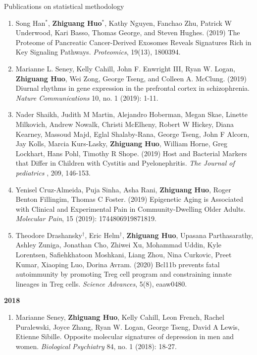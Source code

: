 \documentclass{resume} %
\begin{document}
\begin{rSection}{Publications on statistical methodology}
\begin{enumerate}[noitemsep,topsep=0pt,resume]
\item Song Han$^*$, {\bf Zhiguang Huo}$^*$,  Kathy Nguyen,  Fanchao Zhu, Patrick W Underwood, Kari Basso, Thomas George, and Steven Hughes. (2019)
The Proteome of Pancreatic Cancer-Derived Exosomes Reveals Signatures Rich in Key Signaling Pathways. \emph{Proteomics}, 19(13), 1800394.
    \label{bioinfo_10}

\item Marianne L. Seney, Kelly Cahill, John F. Enwright III, Ryan W. Logan, {\bf  Zhiguang Huo}, Wei Zong, George Tseng, and Colleen A. McClung. (2019) Diurnal rhythms in gene expression in the prefrontal cortex in schizophrenia. \emph{Nature Communications} 10, no. 1 (2019): 1-11.
    \label{bioinfo_9} 


\item  
Nader Shaikh, Judith M Martin, Alejandro Hoberman, Megan Skae, Linette Milkovich, Andrew Nowalk, Christi McElheny, Robert W Hickey, Diana Kearney, Massoud Majd, Eglal Shalaby-Rana, George Tseng, John F Alcorn, Jay Kolls, Marcia Kurs-Lasky, {\bf Zhiguang Huo}, William Horne, Greg Lockhart, Hans Pohl, Timothy R Shope. 
(2019)
Host and Bacterial Markers that Differ in Children with Cystitis and Pyelonephritis. \emph{The Journal of pediatrics} , 209, 146-153.
    \label{bioinfo_8} \label{mlapp_2} 


\item Yenisel Cruz-Almeida, Puja Sinha, Asha Rani, {\bf Zhiguang Huo}, Roger Benton Fillingim, Thomas C Foster. (2019)
Epigenetic Aging is Associated with Clinical and Experimental Pain in Community-Dwelling Older Adults.
\emph{Molecular Pain}, 15 (2019): 1744806919871819.
    \label{bioinfo_7}


\item 
Theodore Drashansky$^\dagger$, Eric  Helm$^\dagger$, {\bf Zhiguang Huo}, Upasana Parthasarathy,  Ashley Zuniga, Jonathan Cho, Zhiwei Xu,  Mohammad Uddin,  Kyle Lorentsen, Safiehkhatoon Moshkani, Liang Zhou, Nina Curkovic, Preet Kumar,  Xiaoping Luo, Dorina Avram. (2020)
Bcl11b prevents fatal autoimmunity by promoting Treg cell program and constraining innate lineages in Treg cells. 
\emph{Science Advances}, 5(8), eaaw0480.
    \label{bioinfo_6}



\end{enumerate}

\textbf{2018}
\begin{enumerate}[noitemsep,topsep=0pt, resume]

\item Marianne Seney,  {\bf Zhiguang Huo},  Kelly Cahill, Leon French, Rachel Puralewski, Joyce Zhang, Ryan W. Logan, George Tseng, David A Lewis, Etienne Sibille. Opposite molecular signatures of depression in men and women. \emph{Biological Psychiatry}  84, no. 1 (2018): 18-27.
    \label{bioinfo_5}



\end{enumerate}
\end{rSection}
\end{document}
